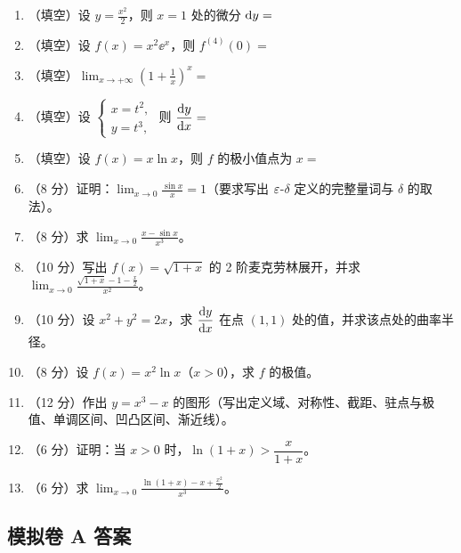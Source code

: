 \begin{enumerate}[label=\textbf{A\arabic*.}]
\begin{enumerate}[label=(\Alph*),nosep]
    \end{enumerate}
  \item （填空）设 $y=\frac{x^{2}}{2}$，则 $x=1$ 处的微分 $\mathrm{d} y=$ \underline{\hspace{2.5cm}}
  \item （填空）设 $f(x)=x^{2}\ee^{x}$，则 $f^{(4)}(0)=$ \underline{\hspace{2.5cm}}
  \item （填空）$\displaystyle\lim_{x\to+\infty}\left(1+\frac1x\right)^{x}=$ \underline{\hspace{2.5cm}}
  \item （填空）设 $\begin{cases}x=t^{2},\\ y=t^{3},\end{cases}$ 则 $\dfrac{\mathrm{d} y}{\mathrm{d} x}=$ \underline{\hspace{2.5cm}}
  \item （填空）设 $f(x)=x\ln x$，则 $f$ 的极小值点为 $x=$ \underline{\hspace{2.5cm}}
  \item （8 分）证明：$\displaystyle\lim_{x\to0}\frac{\sin x}{x}=1$（要求写出 $\varepsilon$-$\delta$ 定义的完整量词与 $\delta$ 的取法）。
  \item （8 分）求 $\displaystyle\lim_{x\to0}\frac{x-\sin x}{x^{3}}$。
  \item （10 分）写出 $f(x)=\sqrt{1+x}$ 的 2 阶麦克劳林展开，并求 $\displaystyle\lim_{x\to0}\frac{\sqrt{1+x}-1-\frac{x}{2}}{x^{2}}$。
  \item （10 分）设 $x^{2}+y^{2}=2x$，求 $\dfrac{\mathrm{d} y}{\mathrm{d} x}$ 在点 $(1,1)$ 处的值，并求该点处的曲率半径。
  \item （8 分）设 $f(x)=x^{2}\ln x$（$x>0$），求 $f$ 的极值。
  \item （12 分）作出 $y=x^{3}-x$ 的图形（写出定义域、对称性、截距、驻点与极值、单调区间、凹凸区间、渐近线）。
  \item （6 分）证明：当 $x>0$ 时，$\ln(1+x)>\dfrac{x}{1+x}$。
  \item （6 分）求 $\displaystyle\lim_{x\to0}\frac{\ln(1+x)-x+\frac{x^{2}}{2}}{x^{3}}$。
\end{enumerate}

\subsection{模拟卷 A 答案}

